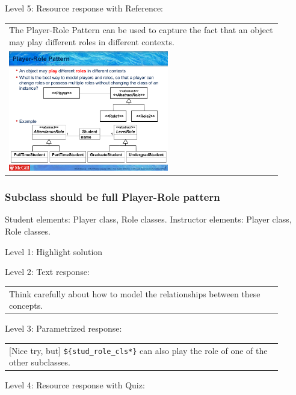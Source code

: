 \noindent Level 5: Resource response with Reference: \medskip

\begin{tabular}{|p{0.9\linewidth}}
The Player-Role Pattern can be used to capture the fact that an object may play different roles
in different contexts.

\\
\includegraphics[width=0.6\textwidth]{images/player_role.png}
\end{tabular} \medskip


\subsubsection{Subclass should be full Player-Role pattern}

Student elements: Player class, Role classes. Instructor elements: Player class, Role classes. \medskip

\noindent Level 1: Highlight solution  \medskip

\noindent Level 2: Text response: \medskip

\begin{tabular}{|p{0.9\linewidth}}
Think carefully about how to model the relationships between these concepts.
\end{tabular} \medskip

\noindent Level 3: Parametrized response: \medskip

\begin{tabular}{|p{0.9\linewidth}}
[Nice try, but] \verb|${stud_role_cls*}| can also play the role of one of the other subclasses.
\end{tabular} \medskip

\noindent Level 4: Resource response with Quiz: \medskip


